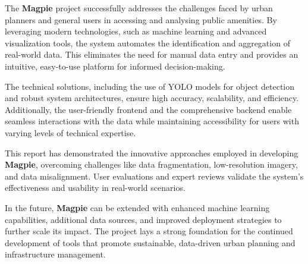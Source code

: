 The \textbf{Magpie} project successfully addresses the challenges faced by urban
planners and general users in accessing and analysing public amenities. By
leveraging modern technologies, such as machine learning and advanced
visualization tools, the system automates the identification and aggregation of
real-world data. This eliminates the need for manual data entry and provides an
intuitive, easy-to-use platform for informed decision-making.

The technical solutions, including the use of YOLO models for object detection
and robust system architectures, ensure high accuracy, scalability, and
efficiency. Additionally, the user-friendly frontend and the comprehensive
backend enable seamless interactions with the data while maintaining
accessibility for users with varying levels of technical expertise.

This report has demonstrated the innovative approaches employed in developing
\textbf{Magpie}, overcoming challenges like data fragmentation, low-resolution
imagery, and data misalignment. User evaluations and expert reviews validate the
system’s effectiveness and usability in real-world scenarios.

In the future, \textbf{Magpie} can be extended with enhanced machine learning
capabilities, additional data sources, and improved deployment strategies to
further scale its impact. The project lays a strong foundation for the continued
development of tools that promote sustainable, data-driven urban planning and
infrastructure management.
